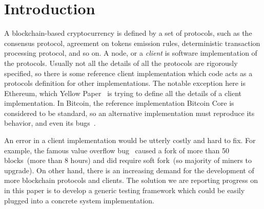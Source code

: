 
\section{Introduction}

A blockchain-based cryptocurrency is defined by a set of protocols, such as the consensus protocol, agreement on tokens emission rules, deterministic transaction processing protocol, and so on. A node, or a {\em client} is software implementation of the protocols. Usually not all the details of all the protocols are rigorously specified, so there is some reference client implementation which code acts as a protocols definition for other implementations. The notable exception here is Ethereum, which Yellow Paper~\cite{ethyp} is trying to define all the details of a client implementation. In Bitcoin, the reference implementation Bitcoin Core is considered to be standard, so an alternative implementation must reproduce its behavior, and even its bugs~\cite{bitbugs}. 

An error in a client implementation would be utterly costly and hard to fix. For example, the famous value overflow bug~\cite{overflow} caused a fork of more than 50 blocks~(more than 8 hours) and did require soft fork~(so majority of miners to upgrade). On other hand, there is an increasing demand for the development of more blockchain protocols and clients. The solution we are reporting progress on in this paper is to develop a generic testing framework which could be easily plugged into a concrete system implementation.  
